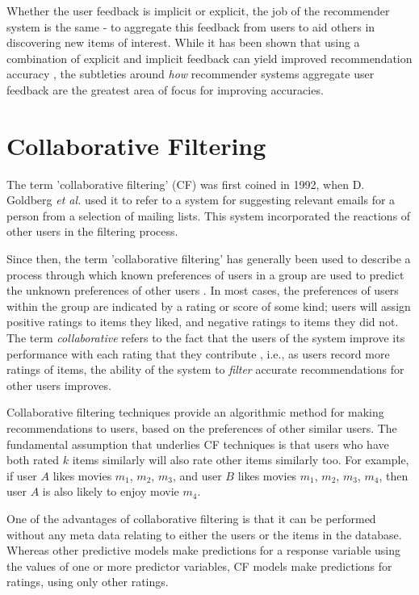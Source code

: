 Whether the user feedback is implicit or explicit, the job of the recommender system is the same - to aggregate this feedback from users to aid others in discovering new items of interest. While it has been shown that using a combination of explicit and implicit feedback can yield improved recommendation accuracy \parencite{cf_1.4_comparison}, the subtleties around \textit{how} recommender systems aggregate user feedback are the greatest area of focus for improving accuracies.

\section{Collaborative Filtering}
The term 'collaborative filtering' (CF) was first coined in 1992, when D. Goldberg \textit{et al.} used it to refer to a system for suggesting relevant emails for a person from a selection of mailing lists. This system incorporated the reactions of other users in the filtering process. \parencite{cf_1.3_origin}

Since then, the term 'collaborative filtering' has generally been used to describe a process through which known preferences of users in a group are used to predict the unknown preferences of other users \parencite{cf_1.1}. In most cases, the preferences of users within the group are indicated by a rating or score of some kind; users will assign positive ratings to items they liked, and negative ratings to items they did not. The term \textit{collaborative} refers to the fact that the users of the system improve its performance with each rating that they contribute \parencite{cf_1.2_eigentaste}, i.e., as users record more ratings of items, the ability of the system to \textit{filter} accurate recommendations for other users improves. 

Collaborative filtering techniques provide an algorithmic method for making recommendations to users, based on the preferences of other similar users. The fundamental assumption that underlies CF techniques is that users who have both rated $k$ items similarly will also rate other items similarly too. For example, if user $A$ likes movies $m_1$, $m_2$, $m_3$, and user $B$ likes movies $m_1$, $m_2$, $m_3$, $m_4$, then user $A$ is also likely to enjoy movie $m_4$.

One of the advantages of collaborative filtering is that it can be performed without any meta data relating to either the users or the items in the database. Whereas other predictive models make predictions for a response variable using the values of one or more predictor variables, CF models make predictions for ratings, using only other ratings.

